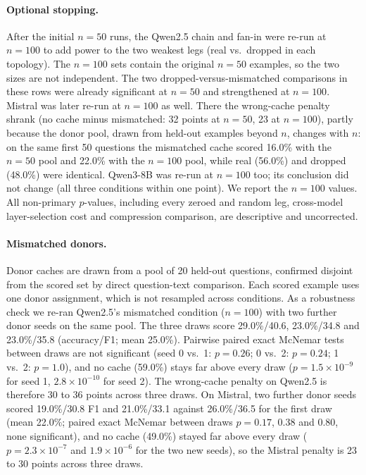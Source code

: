 \documentclass[11pt]{article}
\begin{document}
\paragraph{Optional stopping.} After the initial $n{=}50$ runs, the Qwen2.5
chain and fan-in were re-run at $n{=}100$ to add power to the two weakest legs
(real vs.\ dropped in each topology). The $n{=}100$ sets contain the original
$n{=}50$ examples, so the two sizes are not independent. The two
dropped-versus-mismatched comparisons in these rows were already significant
at $n{=}50$ and strengthened at $n{=}100$. Mistral was later re-run at $n{=}100$
as well. There the wrong-cache penalty shrank (no cache minus mismatched: 32
points at $n{=}50$, 23 at $n{=}100$), partly because the donor pool, drawn from
held-out examples beyond $n$, changes with $n$: on the same first 50 questions
the mismatched cache scored 16.0\% with the $n{=}50$ pool and 22.0\% with the
$n{=}100$ pool, while real (56.0\%) and dropped (48.0\%) were identical.
Qwen3-8B was re-run at $n{=}100$ too; its conclusion did not change (all three
conditions within one point). We report the $n{=}100$ values. All non-primary
$p$-values,
including every zeroed and random leg, cross-model layer-selection cost and
compression comparison, are descriptive and uncorrected.

\paragraph{Mismatched donors.} Donor caches are drawn from a pool of 20
held-out questions, confirmed disjoint from the scored set by direct
question-text comparison. Each scored example uses one donor assignment, which
is not resampled across conditions. As a robustness check we re-ran Qwen2.5's
mismatched condition ($n{=}100$) with two further donor seeds on the same pool.
The three draws score 29.0\%/40.6, 23.0\%/34.8 and 23.0\%/35.8 (accuracy/F1; mean
25.0\%). Pairwise paired exact McNemar tests between draws are not significant
(seed 0 vs.\ 1: $p=0.26$; 0 vs.\ 2: $p=0.24$; 1 vs.\ 2: $p=1.0$), and no cache
(59.0\%) stays far above every draw ($p=1.5\times10^{-9}$ for seed 1,
$2.8\times10^{-10}$ for seed 2). The wrong-cache penalty on Qwen2.5 is therefore
30 to 36 points across three draws. On Mistral, two further donor seeds scored
19.0\%/30.8 F1 and 21.0\%/33.1 against 26.0\%/36.5 for the first draw (mean
22.0\%; paired exact McNemar between draws $p=0.17$, $0.38$ and $0.80$, none
significant), and no cache (49.0\%) stayed far above every draw
($p=2.3\times10^{-7}$ and $1.9\times10^{-6}$ for the two new seeds), so the Mistral
penalty is 23 to 30 points across three draws.
\end{document}
